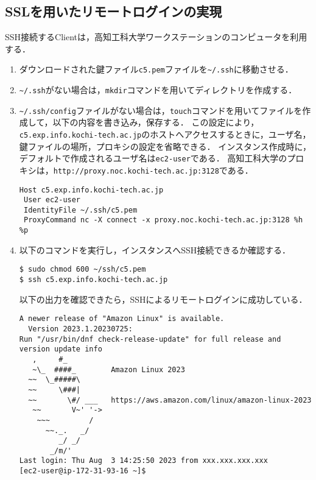 \subsection{SSLを用いたリモートログインの実現}
SSH接続するClientは，高知工科大学ワークステーションのコンピュータを利用する．
\begin{enumerate}
  \item ダウンロードされた鍵ファイル\texttt{c5.pem}ファイルを\texttt{\textasciitilde/.ssh}に移動させる．
  \item \texttt{\textasciitilde/.ssh}がない場合は，\texttt{mkdir}コマンドを用いてディレクトリを作成する．
  \item \texttt{\textasciitilde/.ssh/config}ファイルがない場合は，\texttt{touch}コマンドを用いてファイルを作成して，以下の内容を書き込み，保存する．
        この設定により，\texttt{c5.exp.info.kochi-tech.ac.jp}のホストへアクセスするときに，ユーザ名，鍵ファイルの場所，プロキシの設定を省略できる．
        インスタンス作成時に，デフォルトで作成されるユーザ名は\texttt{ec2-user}である．
        高知工科大学のプロキシは，\texttt{http://proxy.noc.kochi-tech.ac.jp:3128}である．
        \begin{lstlisting}[style=file,caption={\ttfamily \textasciitilde/.ssh/config},escapechar={}]
Host c5.exp.info.kochi-tech.ac.jp
 User ec2-user
 IdentityFile ~/.ssh/c5.pem
 ProxyCommand nc -X connect -x proxy.noc.kochi-tech.ac.jp:3128 %h %p
        \end{lstlisting}
  \item 以下のコマンドを実行し，インスタンスへSSH接続できるか確認する．
        \begin{lstlisting}
$ sudo chmod 600 ~/ssh/c5.pem
$ ssh c5.exp.info.kochi-tech.ac.jp
          \end{lstlisting}
        以下の出力を確認できたら，SSHによるリモートログインに成功している．
        \begin{lstlisting}
A newer release of "Amazon Linux" is available.
  Version 2023.1.20230725:
Run "/usr/bin/dnf check-release-update" for full release and version update info
   ,     #_
   ~\_  ####_        Amazon Linux 2023
  ~~  \_#####\
  ~~     \###|
  ~~       \#/ ___   https://aws.amazon.com/linux/amazon-linux-2023
   ~~       V~' '->
    ~~~         /
      ~~._.   _/
         _/ _/
       _/m/'
Last login: Thu Aug  3 14:25:50 2023 from xxx.xxx.xxx.xxx
[ec2-user@ip-172-31-93-16 ~]$ 
\end{lstlisting}
\end{enumerate}
